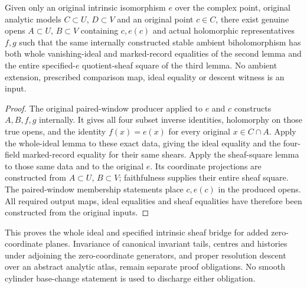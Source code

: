 \begin{theorem}
\label{hir:actual-intrinsic-stable-ideal-square-producer}
\leanok
Given only an original intrinsic isomorphism $e$ over the complex point,
original analytic models $C\subset U$, $D\subset V$ and an original
point $c\in C$, there exist genuine opens $A\subset U$, $B\subset V$
containing $c,e(c)$ and actual holomorphic representatives $f,g$ such
that the same internally constructed stable ambient biholomorphism
has both whole vanishing-ideal and marked-record equalities of the
second lemma and the entire specified-$e$ quotient-sheaf square of
the third lemma. No ambient extension, prescribed comparison map,
ideal equality or descent witness is an input.
\end{theorem}
\begin{proof}
The original paired-window producer applied to $e$ and $c$ constructs
$A,B,f,g$ internally. It gives all four subset inverse identities,
holomorphy on those true opens, and the identity $f(x)=e(x)$ for
every original $x\in C\cap A$. Apply the whole-ideal lemma to
these exact data, giving the ideal equality and the four-field
marked-record equality for their same shears. Apply the sheaf-square
lemma to those same data and to the original $e$. Its coordinate
projections are constructed from $A\subset U$, $B\subset V$;
faithfulness supplies their entire sheaf square. The paired-window
membership statements place $c,e(c)$ in the produced opens. All
required output maps, ideal equalities and sheaf equalities have
therefore been constructed from the original inputs.
\end{proof}

This proves the whole ideal and specified intrinsic sheaf bridge for
added zero-coordinate planes. Invariance of canonical invariant tails,
centres and histories under adjoining the zero-coordinate generators,
and proper resolution descent over an abstract analytic atlas, remain
separate proof obligations. No smooth cylinder base-change statement
is used to discharge either obligation.
